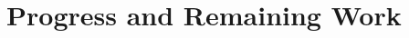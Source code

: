 \documentclass{article}
\begin{document}
\section{Progress and Remaining Work}

\nocite{rumelhart1986learning,glorot2010understanding,telgarsky2016benefits}



\end{document}
